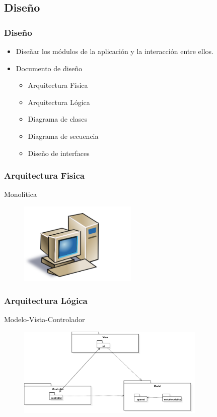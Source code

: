 \documentclass[9pt]{beamer}
\begin{document}
    \subsection{Diseño}
    \begin{frame}
        \frametitle{Diseño}                 
                
        \begin{itemize}
            \item Diseñar los módulos de la aplicación y la interacción entre ellos.
            \item Documento de diseño
            
            \begin{itemize}
                \item Arquitectura Física
                \item Arquitectura Lógica
                \item Diagrama de clases
                \item Diagrama de secuencia
                \item Diseño de interfaces
            \end{itemize}
        \end{itemize}

    \end{frame}

    \begin{frame}
        \frametitle{Arquitectura Fisica}                       
        Monolítica
        \begin{figure}
            \includegraphics[width=0.5\textwidth]{assets/ArquitecturaFisica.png}
        \end{figure}

    \end{frame}

    \begin{frame}
        \frametitle{Arquitectura Lógica}  

        Modelo-Vista-Controlador
        \begin{figure}
            \includegraphics[width=0.8\textwidth]{assets/ArquitecturaLogica.png}
        \end{figure}

    \end{frame}
\end{document}
